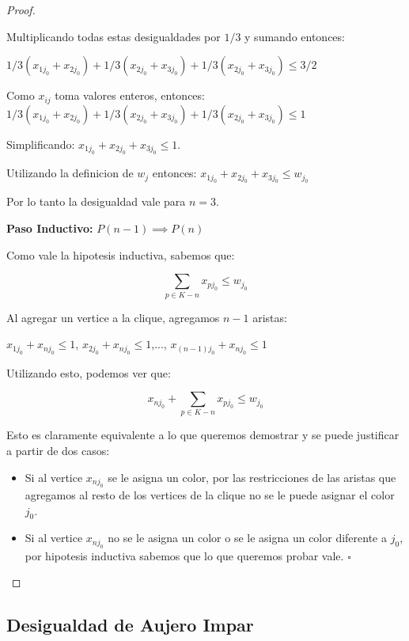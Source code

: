 \begin{proof}
\begin{enumerate}
Multiplicando todas estas desigualdades por $1/3$ y sumando entonces:

$1/3 (x_{1j_0} + x_{2j_0})  + 1/3 (x_{2j_0} + x_{3j_0}) + 1/3 (x_{2j_0} + x_{3j_0}) \leq 3/2$

Como $x_{ij}$ toma valores enteros, entonces:
$1/3 (x_{1j_0} + x_{2j_0})  + 1/3 (x_{2j_0} + x_{3j_0}) + 1/3 (x_{2j_0} + x_{3j_0}) \leq 1$

Simplificando: $x_{1j_0} + x_{2j_0} +  x_{3j_0} \leq 1$.

Utilizando la definicion de $w_j$ entonces: $x_{1j_0} + x_{2j_0} +  x_{3j_0} \leq w_{j_0}$

Por lo tanto la desigualdad vale para $n=3$.

\end{enumerate}

\hfill

\textbf{Paso Inductivo:} $P(n-1) \implies P(n)$

Como vale la hipotesis inductiva, sabemos que:

\begin{equation*}
\sum_{p \in K-n} x_{pj_0} \leq w_{j_0}
\end{equation*}

Al agregar un vertice a la clique, agregamos $n-1$ aristas:

$x_{1j_0} + x_{nj_0} \leq 1$, $x_{2j_0} + x_{nj_0} \leq 1$,...,
$x_{(n-1)j_0} + x_{nj_0} \leq 1$

Utilizando esto, podemos ver que:

\begin{equation*}
x_{nj_0} + \sum_{p \in K-n} x_{pj_0} \leq w_{j_0}
\end{equation*}

Esto es claramente equivalente a lo que queremos demostrar y se puede justificar a partir de dos casos:

\begin{itemize}
\item Si al vertice $x_{nj_0}$ se le asigna un color, por las restricciones de las aristas que agregamos al resto de los vertices de la clique no se le puede asignar el color $j_0$.
\item Si al vertice $x_{nj_0}$ no se le asigna un color o se le asigna un color diferente a $j_0$, por hipotesis inductiva sabemos que lo que queremos probar vale. \hfill $\square$
\end{itemize}
\end{proof}

\subsection{Desigualdad de Aujero Impar}

